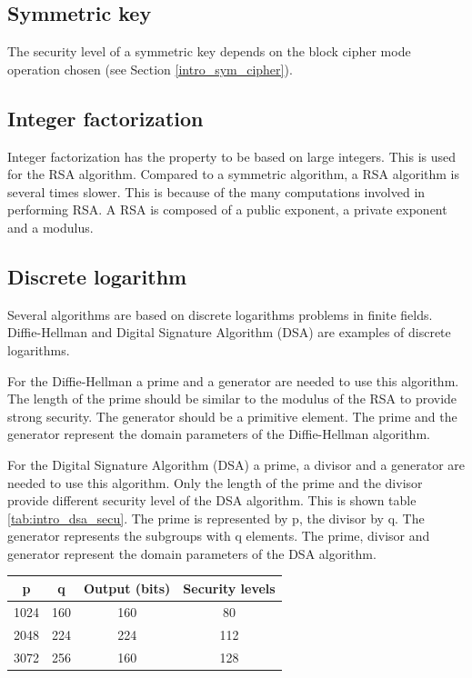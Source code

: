 \subsection*{Symmetric key}

The security level of a symmetric key depends on the block cipher mode
operation chosen (see Section \ref{intro_sym_cipher}).

\subsection*{Integer factorization}

Integer factorization has the property to be based on large integers. This is
used for the RSA algorithm.
Compared to a symmetric algorithm, a RSA algorithm is several times slower. This
is because of the many computations involved in performing RSA.
A RSA is composed of a public exponent, a private exponent and a modulus.

\subsection*{Discrete logarithm}

Several algorithms are based on discrete logarithms problems in finite fields.
Diffie-Hellman and Digital Signature Algorithm (DSA) are examples of
discrete logarithms.

For the Diffie-Hellman a prime and a generator are needed to use this algorithm.
The length of the prime should be similar to the modulus of the RSA to provide
strong security. The generator should be a primitive element.
The prime and the generator represent the domain parameters of the
Diffie-Hellman algorithm.

For the Digital Signature Algorithm (DSA) a prime, a divisor and a generator are
needed to use this algorithm. Only the length of the prime and the divisor
provide different security level of the DSA algorithm. This is shown table
\ref{tab:intro_dsa_secu}.
The prime is represented by p, the divisor by q. The generator represents the
subgroups with q elements.
The prime, divisor and generator represent the domain parameters of the DSA
algorithm.\newline

\begin{center}
\begin{tabular}{|*{4}{c|}}

\hline
p		&	q	& Output (bits)	& Security levels \\
\hline
1024	&	160	& 160 			&	80 \\
2048	&	224	& 224 			&	112 \\
3072	&	256	& 160 			& 	128	\\
\hline

\end{tabular}
\label{tab:intro_dsa_secu}

\end{center}


